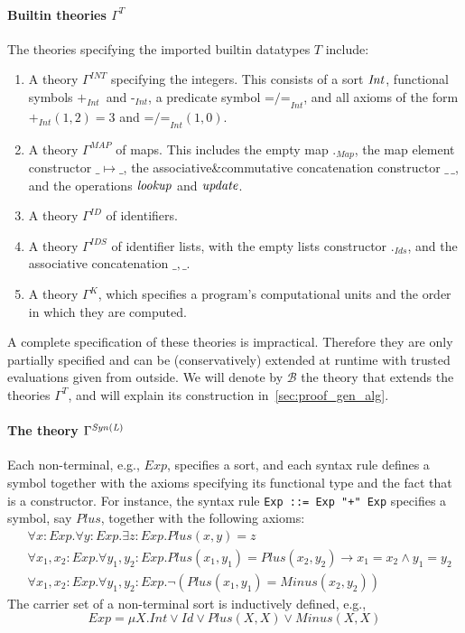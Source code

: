 \documentclass{article}
\theoremstyle{plain}
\theoremstyle{definition}
\newcommand{\INT}{\ensuremath{\mathit{INT}}}
\newcommand{\MAP}{\ensuremath{\mathit{MAP}}}
\newcommand{\ID}{\ensuremath{\mathit{ID}}}
\newcommand{\IDS}{\ensuremath{\mathit{IDS}}}
\newcommand{\Int}{\ensuremath{\mathit{Int}}}
\newcommand{\Id}{\ensuremath{\mathit{Id}}}
\newcommand{\dotIds}{\ensuremath{._\mathit{Ids}}}
\newcommand{\PlusInt}{\ensuremath{\mathbin{{\texttt{+}}_\Int}}}
\newcommand{\MinusInt}{\ensuremath{\mathbin{{\texttt{-}}_\Int}}}
\newcommand{\DiffInt}{\ensuremath{\mathbin{\texttt{=/=}_\Int}}}
\newcommand{\dotMap}{\ensuremath{._\mathit{Map}}}
\newcommand{\Exp}{\ensuremath{\mathit{Exp}}}
\newcommand{\Plus}{\ensuremath{Plus}}
\newcommand{\Minus}{\ensuremath{Minus}}
\begin{document}
\paragraph{Builtin theories $\Gamma^T$\\} The theories specifying the imported builtin datatypes $T$ include:
\begin{enumerate}
\item A theory $\Gamma^{\INT}$ specifying the integers. This consists of a sort $\it Int$, functional symbols \PlusInt\ and \MinusInt, a predicate symbol \DiffInt, and all axioms of the form $\PlusInt(1, 2) = 3$ and $\DiffInt(1, 0)$.
\item A theory $\Gamma^{\MAP}$ of maps. This includes the empty map \dotMap, the map element constructor $\_{\mapsto}\_$, the associative\&commutative concatenation constructor $\_\,\_$, and the operations $\it lookup$ and $\it update$.
\item A theory $\Gamma^\ID$ of identifiers.
\item A theory $\Gamma^\IDS$ of identifier lists, with the empty lists constructor \dotIds, and the associative concatenation $\_,\_$.
\item A theory $\Gamma^K$, which specifies a program's computational units and the order in which they are computed.
\end{enumerate}
A complete specification of these theories is impractical. Therefore they are only partially specified and can be (conservatively) extended at runtime with trusted evaluations given from outside. We will denote by $\mathcal{B}$ the theory that extends the theories $\Gamma^T$, and will explain its construction in~\cref{sec:proof_gen_alg}.

\paragraph{The theory $\Gamma\sp{\it Syn(L)}$\\} Each non-terminal, e.g., \Exp, specifies a sort, and each syntax rule defines a symbol together with the axioms specifying its functional type and the fact that is a constructor. For instance, the syntax rule \verb|Exp ::= Exp "+" Exp| specifies a symbol, say \Plus, together with the following axioms:
\begin{align}
&\forall x:\Exp.\forall y:\Exp. \exists z:\Exp. \Plus(x,y) = z\label{eq:plus1}\\
&\forall x_1,x_2:\Exp.\forall y_1,y_2:\Exp. \Plus(x_1,y_1) = \Plus(x_2,y_2) \rightarrow x_1 = x_2 \land y_1 = y_2\label{eq:plus2}\\
&\forall x_1,x_2:\Exp.\forall y_1,y_2:\Exp. \neg(\Plus(x_1,y_1) = \Minus(x_2,y_2))\label{eq:plus3}
\end{align}
The carrier set of a non-terminal sort is inductively defined, e.g.,
\[
\Exp = \mu X.\Int \lor \Id \lor \Plus(X, X) \lor \Minus(X,X)
\]
\end{document}
